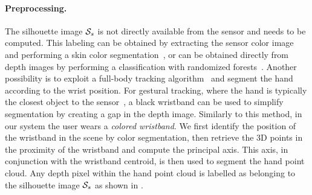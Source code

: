 \label{sec:tech}
\paragraph*{Preprocessing.}
The  silhouette image $\mathcal{S}_{s}$ is not directly available from the sensor and needs to be computed. This labeling can be obtained by extracting  the sensor color image and performing a skin color segmentation~\cite{oiko_cvpr12,schroeder_icra14}, or can be obtained directly from depth images by performing a classification with randomized forests~\cite{tompson_tog14}. Another possibility is to exploit a full-body tracking algorithm~\cite{shotton_cvpr11} and segment the hand according to the wrist position. For gestural tracking, where the hand is typically the closest object to the sensor~\cite{qian_cvpr14}, a black wristband can be used to simplify segmentation by creating a gap in the depth image. Similarly to this method, in our system the user wears a \emph{colored wristband}. We first identify the position of the wristband in the scene by color segmentation,
then retrieve the 3D points in the proximity of the wristband and compute the principal axis. This axis, in conjunction with the wristband centroid, is then used to segment the hand point cloud. Any depth pixel within the hand point cloud is labelled as belonging to the silhouette image $\mathcal{S}_{s}$ as shown in .



